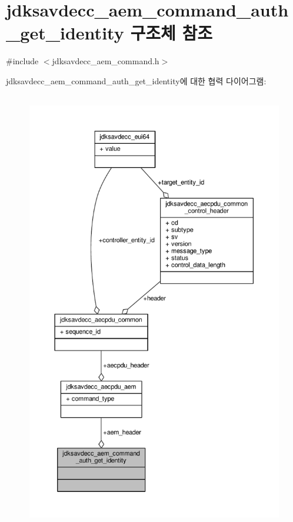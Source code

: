 \hypertarget{structjdksavdecc__aem__command__auth__get__identity}{}\section{jdksavdecc\+\_\+aem\+\_\+command\+\_\+auth\+\_\+get\+\_\+identity 구조체 참조}
\label{structjdksavdecc__aem__command__auth__get__identity}


{\ttfamily \#include $<$jdksavdecc\+\_\+aem\+\_\+command.\+h$>$}



jdksavdecc\+\_\+aem\+\_\+command\+\_\+auth\+\_\+get\+\_\+identity에 대한 협력 다이어그램\+:
\nopagebreak
\begin{figure}[H]
\begin{center}
\leavevmode
\includegraphics[height=550pt]{structjdksavdecc__aem__command__auth__get__identity__coll__graph}
\end{center}
\end{figure}
